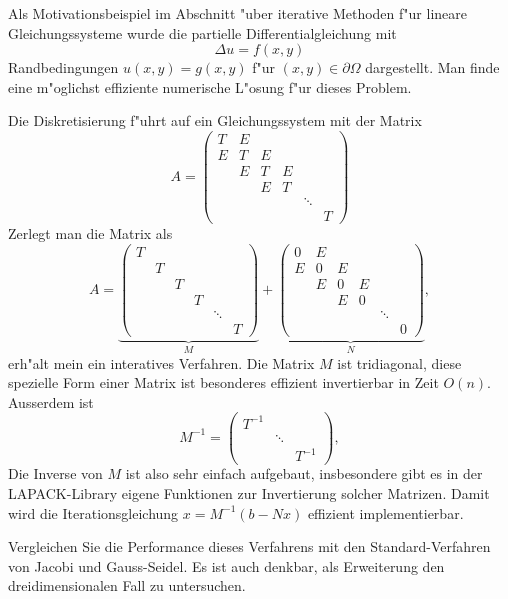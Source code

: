 \begin{aufgabe}
Als Motivationsbeispiel im Abschnitt "uber iterative Methoden f"ur lineare
Gleichungssysteme wurde die partielle Differentialgleichung mit
\[
\Delta u = f(x,y)
\]
Randbedingungen $u(x,y)=g(x,y)$ f"ur $(x,y)\in\partial\Omega$ dargestellt.
Man finde eine m"oglichst effiziente numerische L"osung f"ur dieses Problem.
\end{aufgabe}

Die Diskretisierung f"uhrt auf ein Gleichungssystem mit der Matrix
\[
A=\begin{pmatrix}
T&E& & &      & \\
E&T&E& &      & \\
 &E&T&E&      & \\
 & &E&T&      & \\
 & & & &\ddots& \\
 & & & &      &T
\end{pmatrix}
\]
Zerlegt man die Matrix als
\[
A
=
\underbrace{
\begin{pmatrix}
T& & & &      & \\
 &T& & &      & \\
 & &T& &      & \\
 & & &T&      & \\
 & & & &\ddots& \\
 & & & &      &T
\end{pmatrix}}_M
+
\underbrace{
\begin{pmatrix}
0&E& & &      & \\
E&0&E& &      & \\
 &E&0&E&      & \\
 & &E&0&      & \\
 & & & &\ddots& \\
 & & & &      &0
\end{pmatrix}}_N,
\]
erh"alt mein ein interatives Verfahren.
Die Matrix $M$ ist tridiagonal, diese spezielle Form einer Matrix ist
besonderes effizient invertierbar in Zeit $O(n)$.
Ausserdem ist
\[
M^{-1}=\begin{pmatrix}
T^{-1}&      &      \\
      &\ddots&      \\
      &      &T^{-1}
\end{pmatrix},
\]
Die Inverse von $M$ ist also sehr einfach aufgebaut,
insbesondere gibt es in der LAPACK-Library eigene Funktionen zur 
Invertierung solcher Matrizen.
Damit wird die Iterationsgleichung
$ x=M^{-1}(b - Nx)$
effizient implementierbar.

Vergleichen Sie die Performance dieses Verfahrens mit den Standard-Verfahren
von Jacobi und Gauss-Seidel.
Es ist auch denkbar, als Erweiterung den dreidimensionalen Fall zu untersuchen.
